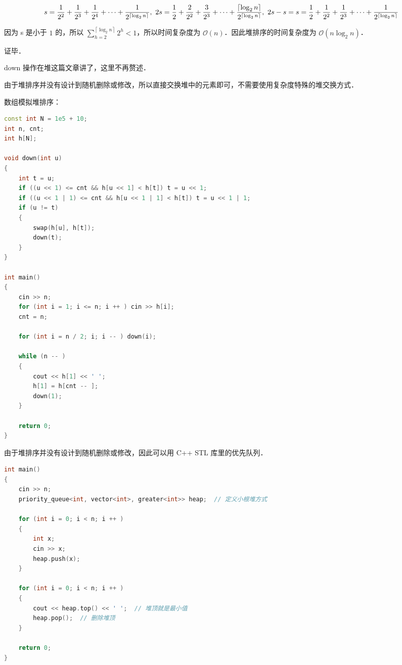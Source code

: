 \begin{equation}
s = \dfrac{1}{2^2} + \dfrac{1}{2^3} + \dfrac{1}{2^4} + \cdots +\dfrac{1}{2^{\left\lceil{\log_2 n}\right\rceil}} \\
, \ 2s = \dfrac{1}{2} + \dfrac{2}{2^2} + \dfrac{3}{2^3} + \cdots + \dfrac{\left\lceil{\log_2 n}\right\rceil}{2^{\left\lceil{\log_2 n}\right\rceil}} \\
, \ 2s - s = s= \dfrac{1}{2} + \dfrac{1}{2^2} + \dfrac{1}{2^3} + \cdots + \dfrac{1}{2^{\left\lceil{\log_2 n}\right\rceil}}
\end{equation}


因为 s 是小于 $1$ 的，所以 $\sum^{\left\lceil{\log_2 n}\right\rceil} _ {h = 2} 2^h < 1$，所以时间复杂度为 $\mathcal{O}(n)$．因此堆排序的时间复杂度为 $\mathcal{O}(n \log_2 n)$．

证毕．

down 操作在堆这篇文章讲了，这里不再赘述．

 由于堆排序并没有设计到随机删除或修改，所以直接交换堆中的元素即可，不需要使用复杂度特殊的堆交换方式．

数组模拟堆排序：
\begin{lstlisting}[language=cpp]
const int N = 1e5 + 10;
int n, cnt;
int h[N];

void down(int u)
{
    int t = u;
    if ((u << 1) <= cnt && h[u << 1] < h[t]) t = u << 1;
    if ((u << 1 | 1) <= cnt && h[u << 1 | 1] < h[t]) t = u << 1 | 1;
    if (u != t)
    {
        swap(h[u], h[t]);
        down(t);
    }
}

int main()
{
    cin >> n;
    for (int i = 1; i <= n; i ++ ) cin >> h[i];
    cnt = n;
    
    for (int i = n / 2; i; i -- ) down(i);
    
    while (n -- )
    {
        cout << h[1] << ' ';
        h[1] = h[cnt -- ];
        down(1);
    }
    
    return 0;
}
\end{lstlisting}

由于堆排序并没有设计到随机删除或修改，因此可以用 C++ STL 库里的优先队列．

\begin{lstlisting}[language=cpp]
int main()
{
    cin >> n;
    priority_queue<int, vector<int>, greater<int>> heap;  // 定义小根堆方式
    
    for (int i = 0; i < n; i ++ )
    {
        int x;
        cin >> x;
        heap.push(x);
    }
    
    for (int i = 0; i < n; i ++ )
    {
        cout << heap.top() << ' ';  // 堆顶就是最小值
        heap.pop();  // 删除堆顶
    }
    
    return 0;
}
\end{lstlisting}
